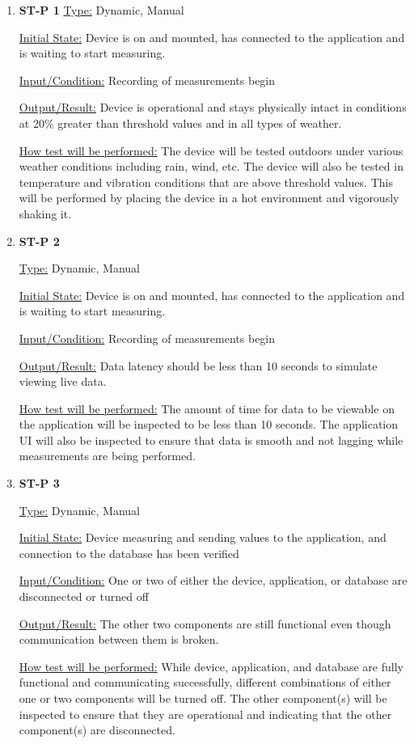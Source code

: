 \documentclass[12pt, titlepage]{article}
\begin{document}
\begin{enumerate}

\item{\bf{ST-P 1}}
\underline{Type:} Dynamic, Manual
					
\underline{Initial State:} Device is on and mounted, has connected to the application and is waiting to start measuring.
					
\underline{Input/Condition:} Recording of measurements begin
					
\underline{Output/Result:} Device is operational and stays physically intact in conditions at 20\% greater than threshold values and in all types of weather.
					
\underline{How test will be performed:} The device will be tested outdoors under various weather conditions including rain, wind, etc.
The device will also be tested in temperature and vibration conditions that are above threshold values. This will be performed by placing the device in a hot environment
and vigorously shaking it.
					
\item{\bf{ST-P 2}}

\underline{Type:} Dynamic, Manual
					
\underline{Initial State:} Device is on and mounted, has connected to the application and is waiting to start measuring.
					
\underline{Input/Condition:} Recording of measurements begin
					
\underline{Output/Result:} Data latency should be less than 10 seconds to simulate viewing live data.
					
\underline{How test will be performed:} The amount of time for data to be viewable on the application will be inspected to be less than 10 seconds.
The application UI will also be inspected to ensure that data is smooth and not lagging while measurements are being performed.

\item{\bf{ST-P 3}}

\underline{Type:} Dynamic, Manual
					
\underline{Initial State:} Device measuring and sending values to the application, and connection to the database has been verified
					
\underline{Input/Condition:} One or two of either the device, application, or database are disconnected or turned off
					
\underline{Output/Result:} The other two components are still functional even though communication between them is broken.
					
\underline{How test will be performed:} While device, application, and database are fully functional and communicating successfully, different combinations of either one or two components
will be turned off. The other component(s) will be inspected to ensure that they are operational and indicating that the other component(s) are disconnected.

\end{enumerate}
\newpage
\end{document}

